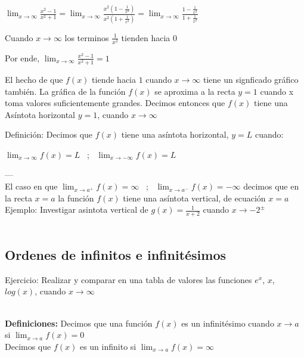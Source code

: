 \documentclass[11pt, a4paper]{article}
\begin{document}
{\begin{center}
    $\displaystyle \lim_{x \to \infty} \frac{x^2-1}{x^2+1} = \lim_{x\to\infty} \frac{x^2(1-\frac{1}{x^2})}{x^2(1+\frac{1}{x^2})} = \lim_{x\to\infty} \frac{1-\frac{1}{x^2}}{1+\frac{1}{x^2}} $ \\ \hfill

    Cuando {\color{blue} $x \to \infty $} los terminos {\color{blue}$\frac{1}{x^2}$} tienden hacia {\color{blue}$0$} \\ \hfill

    Por ende, $\displaystyle \lim_{x \to \infty} \frac{x^2-1}{x^2+1} = 1 $     
\end{center}

El hecho de que $f(x)$ tiende hacia $1$ cuando $x \to \infty$ tiene un signficado gr\'afico tambi\'en. La gr\'afica de la funci\'on $f(x)$ se aproxima a la recta $y=1$ cuando x toma valores suficientemente grandes. Decimos entonces que $f(x)$ tiene una {\color{blue} As\'intota horizontal} $y=1$, cuando $x\to \infty$ \\ 

\begin{center}
    Definici\'on: Decimos que $f(x)$ tiene una {\color{blue} as\'intota horizontal, $y = L$ } cuando: \\ \hfill

    $ \displaystyle \lim_{x\to\infty} f(x) = L $ ~;~ $ \displaystyle \lim_{x\to -\infty} f(x) = L $ 
\end{center}

---\\ 
El caso en que $ \displaystyle \lim_{x\to a^+} f(x) = \infty $ ~;~ $ \displaystyle \lim_{x\to a^-} f(x) = -\infty $ decimos que en la recta $x=a$ la funci\'on $f(x)$ tiene una {\color{blue} as\'intota vertical, de ecuaci\'on $x=a$ } {\color{magenta} Ejemplo: Investigar asintota vertical de $g(x)= \frac{1}{x+2} $ cuando $ x \to -2^{\pm} $ } \\ \\

\subsection{Ordenes de infinitos e infinit\'esimos }
{\color{magenta} Ejercicio: Realizar y comparar en una tabla de valores las funciones $e^x$, $x$, $log(x)$, cuando $x\to \infty $   } \\ \\ 

\begin{center}
    \textbf{Definiciones:} Decimos que una funci\'on $f(x)$ es un {\color{blue} infinit\'esimo } cuando $x \to a$ si $ \displaystyle \lim_{x\to a} f(x) = 0 $ \\ 
    Decimos que $f(x)$ es un {\color{blue}infinito} si $ \displaystyle \lim_{x\to a} f(x) = \infty $
\end{center}

}
\end{document}
